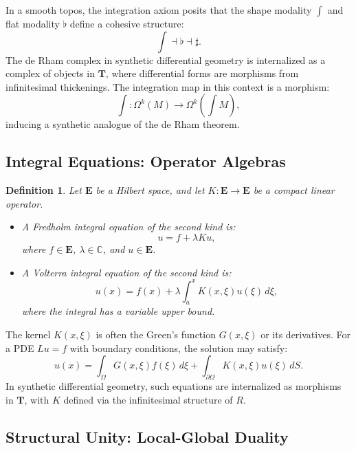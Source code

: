 \documentclass{article}
\theoremstyle{plain}
\newtheorem{definition}{Definition}[section]
\newcommand{\cat}[1]{\mathbf{#1}}
\begin{document}
In a smooth topos, the integration axiom posits that the shape
modality \(\int\) and flat modality \(\flat\) define a cohesive structure:
\[
\int \dashv \flat \dashv \sharp.
\]
The de Rham complex in synthetic differential geometry is internalized
as a complex of objects in \(\cat{T}\), where differential forms are
morphisms from infinitesimal thickenings. The integration map in this context is a morphism:
\[
\int: \Omega^k(M) \to \Omega^k(\int M),
\]
inducing a synthetic analogue of the de Rham theorem.

\subsection{Integral Equations: Operator Algebras}

\begin{definition}
Let \(\cat{E}\) be a Hilbert space, and let \(K: \cat{E} \to \cat{E}\) be a compact linear operator.
\begin{itemize}
    \item A \emph{Fredholm integral equation of the second kind} is:
    \[
    u = f + \lambda K u,
    \]
    where \(f \in \cat{E}\), \(\lambda \in \mathbb{C}\), and \(u \in \cat{E}\).
    \item A \emph{Volterra integral equation of the second kind} is:
    \[
    u(x) = f(x) + \lambda \int_a^x K(x, \xi) u(\xi) \, d\xi,
    \]
    where the integral has a variable upper bound.
\end{itemize}
\end{definition}

The kernel \(K(x, \xi)\) is often the Green's function \(G(x, \xi)\) or its derivatives.
 For a PDE \(L u = f\) with boundary conditions, the solution may satisfy:
\[
u(x) = \int_\Omega G(x, \xi) f(\xi) \, d\xi + \int_{\partial \Omega} K(x, \xi) u(\xi) \, dS.
\]
In synthetic differential geometry, such equations are internalized as
morphisms in \(\cat{T}\), with \(K\) defined via the infinitesimal structure of \(R\).

\subsection{Structural Unity: Local-Global Duality}
\end{document}
